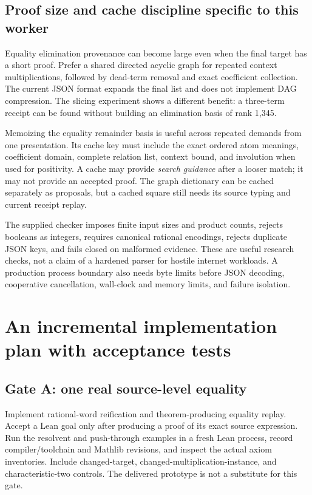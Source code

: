 \subsection{Proof size and cache discipline specific to this worker}

Equality elimination provenance can become large even when the final target
has a short proof. Prefer a shared directed acyclic graph for repeated context
multiplications, followed by dead-term removal and exact coefficient collection.
The current JSON format expands the final list and does not implement DAG
compression. The slicing experiment shows a different benefit: a three-term
receipt can be found without building an elimination basis of rank 1,345.

Memoizing the equality remainder basis is useful across repeated demands from
one presentation. Its cache key must include the exact ordered atom meanings,
coefficient domain, complete relation list, context bound, and involution when
used for positivity. A cache may provide \emph{search guidance} after a looser
match; it may not provide an accepted proof. The graph dictionary can be cached
separately as proposals, but a cached square still needs its source typing and
current receipt replay.

The supplied checker imposes finite input sizes and product counts, rejects
booleans as integers, requires canonical rational encodings, rejects duplicate
JSON keys, and fails closed on malformed evidence. These are useful research
checks, not a claim of a hardened parser for hostile internet workloads. A
production process boundary also needs byte limits before JSON decoding,
cooperative cancellation, wall-clock and memory limits, and failure isolation.

\section{An incremental implementation plan with acceptance tests}
\label{sec:roadmap}

\subsection{Gate A: one real source-level equality}

Implement rational-word reification and theorem-producing equality replay.
Accept a Lean goal only after producing a proof of its exact source expression.
Run the resolvent and push-through examples in a fresh Lean process, record
compiler/toolchain and Mathlib revisions, and inspect the actual axiom
inventories. Include changed-target, changed-multiplication-instance, and
characteristic-two controls. The delivered prototype is not a substitute for
this gate.

